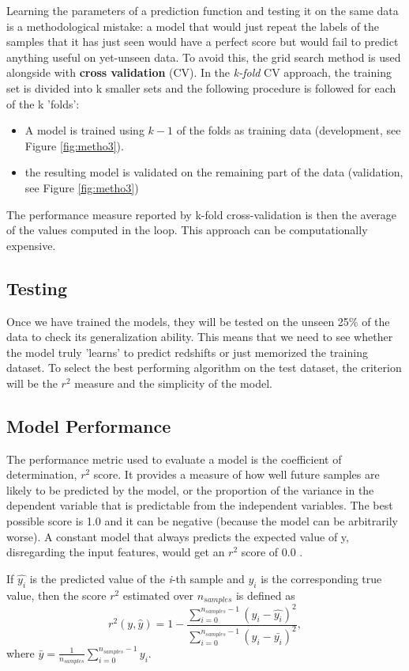Learning the parameters of a prediction function and testing it on the same data is a methodological mistake: a model that would just repeat the labels of the samples that it has just seen would have a perfect score but would fail to predict anything useful on yet-unseen data. To avoid this, the grid search method is used alongside with \textbf{cross validation} (CV). In the \textit{k-fold} CV approach, the training set is divided into k smaller sets and the following procedure is followed for each of the k 'folds':
\begin{itemize}
	\item A model is trained using $k -1$ of the folds as training data (development, see Figure \ref{fig:metho3}).
	\item the resulting model is validated on the remaining part of the data (validation, see Figure \ref{fig:metho3})
\end{itemize}
The performance measure reported by k-fold cross-validation is then the average of the values computed in the loop. This approach can be computationally expensive.

\subsection{Testing}
Once we have trained the models, they will be tested on the unseen 25\% of the data to check its generalization ability. This means that we need to see whether the model truly 'learns' to predict redshifts or just memorized the training dataset. To select the best performing algorithm on the test dataset, the criterion will be the $r^2$ measure and the simplicity of the model.
\subsection{Model Performance}
The performance metric used to evaluate a model is the coefficient of determination, $r^2$ score. It provides a measure of how well future samples are likely to be predicted by the model, or the proportion of the variance in the dependent variable that is predictable from the independent variables. The best possible score is 1.0 and it can be negative (because the model can be arbitrarily worse). A constant model that always predicts the expected value of y, disregarding the input features, would get an $r^2$ score of 0.0 \cite{krr}.

If $\hat{y_i}$ is the predicted value of the \textit{i}-th sample and $y_i$ is the corresponding true value, then the score $r^2$ estimated over $n_{samples}$ is defined as 
\begin{equation}
r^2 (y, \hat{y}) = 1 - \frac{\sum_{i = 0}^{n_{samples} - 1} \left(y_i - \hat{y_i}\right)^2}{\sum_{i = 0}^{n_{samples} - 1} \left(y_i - \bar{y_i}\right)^2},
\end{equation} 
where $\bar{y} = \frac{1}{n_{samples}}\sum_{i = 0}^{n_{samples} - 1} y_i$. 

